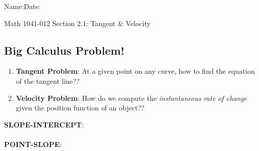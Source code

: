 \documentclass[10pt]{book}
\theoremstyle{definition}
\begin{document}
\begin{flushleft}
Name:\underline{\hspace{13cm}}Date:\underline{\hspace{2cm}}
\end{flushleft}
\begin{center}
{\Large Math 1041-012 \hspace{0.5cm} Section 2.1: Tangent \& Velocity}
\end{center}

\begin{tcolorbox}
\subsection*{Big Calculus Problem!}
\begin{enumerate}
    \item \textbf{Tangent Problem}: At a given point on any curve, how to find the equation of the tangent line??
    \item \textbf{Velocity Problem}: How do we compute the \textit{instantaneous rate of change} given the position function of an object??
\end{enumerate}
\textbf{SLOPE-INTERCEPT}:\\[4PT] \\
\textbf{POINT-SLOPE}: \\ [4PT]
\end{tcolorbox}
\end{document}
